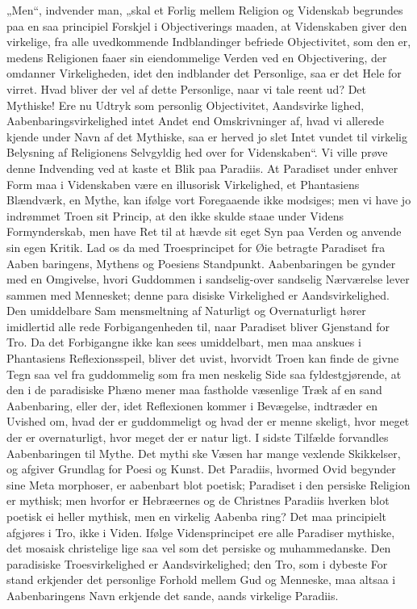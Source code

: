\documentclass[12pt,a4paper]{article}
\newcommand{\opage}[1]{\marginnote{\footnotesize\textit{[#1]}}}
\begin{document}
„Men“, indvender man, „skal et Forlig mellem Religion og
Videnskab begrundes paa en saa principiel Forskjel i Objectiverings\-%
maaden, at Videnskaben giver den virkelige, fra alle uvedkommende
Indblandinger befriede Objectivitet, som den er, medens Religionen
faaer sin eiendommelige Verden ved en Objectivering, der omdanner
Virkeligheden, idet den indblander det Personlige, saa er det Hele for\-%
virret. Hvad bliver der vel af dette Personlige, naar vi tale reent ud?
Det Mythiske! Ere nu Udtryk som personlig Objectivitet, Aandsvirke\-%
lighed, Aabenbaringsvirkelighed intet Andet end Omskrivninger af,
hvad vi allerede kjende under Navn af det Mythiske, saa er herved jo
slet Intet vundet til virkelig Belysning af Religionens Selvgyldig\-%
hed over for Videnskaben“. Vi ville prøve denne Indvending ved
at kaste et Blik paa Paradiis. At Paradiset under enhver Form
maa i Videnskaben være en illusorisk Virkelighed, et Phantasiens
Blændværk, en Mythe, kan ifølge vort Foregaaende ikke modsiges;
men vi have jo indrømmet Troen sit Princip, at den ikke
skulde staae under Videns Formynderskab, men have Ret til at
hævde sit eget Syn paa Verden og anvende sin egen Kritik. Lad
os da med Troesprincipet for Øie betragte Paradiset fra Aaben\-%
baringens, Mythens og Poesiens Standpunkt. Aabenbaringen be\-%
gynder med en Omgivelse, hvori Guddommen i sandselig-over\-%
sandselig Nærværelse lever sammen med Mennesket; denne para\-%
disiske Virkelighed er Aandsvirkelighed. Den umiddelbare Sam\-%
mensmeltning af Naturligt og Overnaturligt hører imidlertid alle\-%
rede Forbigangenheden til, naar Paradiset bliver Gjenstand for
\opage{51}Tro. Da det Forbigangne ikke kan sees umiddelbart, men maa
anskues i Phantasiens Reflexionsspeil, bliver det uvist, hvorvidt
Troen kan finde de givne Tegn saa vel fra guddommelig som fra men\-%
neskelig Side saa fyldestgjørende, at den i de paradisiske Phæno\-%
mener maa fastholde væsenlige Træk af en sand Aabenbaring,
eller der, idet Reflexionen kommer i Bevægelse, indtræder en
Uvished om, hvad der er guddommeligt og hvad der er menne\-%
skeligt, hvor meget der er overnaturligt, hvor meget der er natur\-%
ligt. I sidste Tilfælde forvandles Aabenbaringen til Mythe. Det mythi\-%
ske Væsen har mange vexlende Skikkelser, og afgiver Grundlag for
Poesi og Kunst. Det Paradiis, hvormed Ovid begynder sine Meta\-%
morphoser, er aabenbart blot poetisk; Paradiset i den persiske Religion
er mythisk; men hvorfor er Hebræernes og de Christnes Paradiis
hverken blot poetisk ei heller mythisk, men en virkelig Aabenba\-%
ring? Det maa principielt afgjøres i Tro, ikke i Viden. Ifølge
Vidensprincipet ere alle Paradiser mythiske, det mosaisk christelige
lige saa vel som det persiske og muhammedanske. Den paradisiske
Troesvirkelighed er Aandsvirkelighed; den Tro, som i dybeste For\-%
stand erkjender det personlige Forhold mellem Gud og Menneske,
maa altsaa i Aabenbaringens Navn erkjende det sande, aands\-%
virkelige Paradiis.
\end{document}
